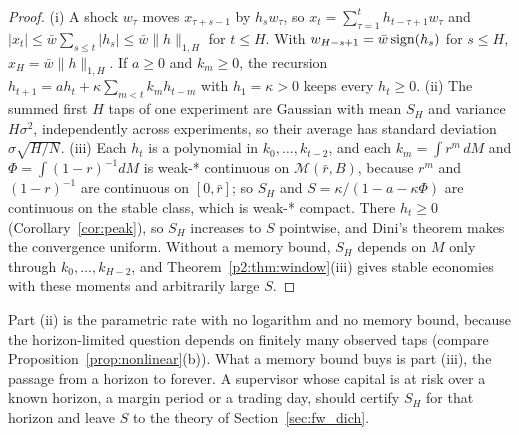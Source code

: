 \begin{proof}
(i) A shock $w_\tau$ moves $x_{\tau+s-1}$ by $h_sw_\tau$, so $x_t=\sum_{\tau=1}^th_{t-\tau+1}w_\tau$ and $|x_t|\le\bar w\sum_{s\le t}|h_s|\le\bar w\|h\|_{1,H}$ for $t\le H$. With $w_{H-s+1}=\bar w\,{\rm sign}(h_s)$ for $s\le H$, $x_H=\bar w\|h\|_{1,H}$. If $a\ge0$ and $k_m\ge0$, the recursion $h_{t+1}=ah_t+\kappa\sum_{m<t}k_mh_{t-m}$ with $h_1=\kappa>0$ keeps every $h_t\ge0$. (ii) The summed first $H$ taps of one experiment are Gaussian with mean $S_H$ and variance $H\sigma^2$, independently across experiments, so their average has standard deviation $\sigma\sqrt{H/N}$. (iii) Each $h_t$ is a polynomial in $k_0,\dots,k_{t-2}$, and each $k_m=\int r^m\,dM$ and $\Phi=\int(1-r)^{-1}dM$ is weak-* continuous on $\mathcal M(\bar r,B)$, because $r^m$ and $(1-r)^{-1}$ are continuous on $[0,\bar r]$; so $S_H$ and $S=\kappa/(1-a-\kappa\Phi)$ are continuous on the stable class, which is weak-* compact. There $h_t\ge0$ (Corollary~\ref{cor:peak}), so $S_H$ increases to $S$ pointwise, and Dini's theorem makes the convergence uniform. Without a memory bound, $S_H$ depends on $M$ only through $k_0,\dots,k_{H-2}$, and Theorem~\ref{p2:thm:window}(iii) gives stable economies with these moments and arbitrarily large $S$.
\end{proof}

Part (ii) is the parametric rate with no logarithm and no memory bound, because the horizon-limited question depends on finitely many observed taps (compare Proposition~\ref{prop:nonlinear}(b)). What a memory bound buys is part (iii), the passage from a horizon to forever. A supervisor whose capital is at risk over a known horizon, a margin period or a trading day, should certify $S_H$ for that horizon and leave $S$ to the theory of Section~\ref{sec:fw_dich}.

